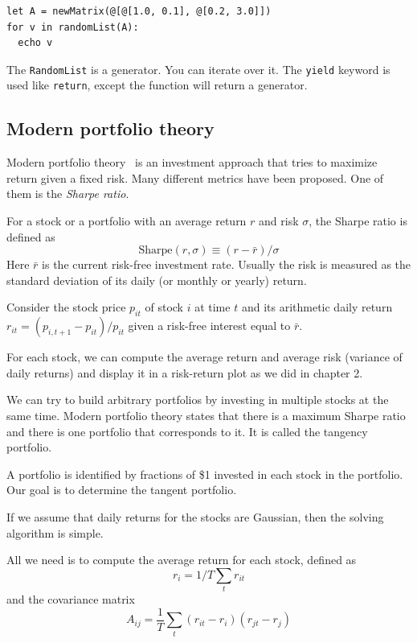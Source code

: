 \documentclass[justified, sixbynine]{tufte-book}
\def\ft{\small\tt}
\theoremstyle{plain}%
\newtheorem * {corollary}{Corollary}
\theoremstyle{definition}
\theoremstyle{remark}
\newtheorem * {remark}{Remark}
\newtheorem * {note}{Note}
\begin{document}
\begin{fullwidth}
\begin{lstlisting}
let A = newMatrix(@[@[1.0, 0.1], @[0.2, 3.0]])
for v in randomList(A):
  echo v
\end{lstlisting}

The {\ft RandomList} is a generator. You can iterate over it. The {\ft yield} keyword is used like {\ft return}, except the function will return a generator.

\goodbreak\subsection{Modern portfolio theory}


Modern portfolio theory~\cite{mpt} is an investment approach that tries to maximize return given a fixed risk. Many different metrics have been proposed. One of them is the {\it Sharpe ratio}.

For a stock or a portfolio with an average return $r$ and risk $\sigma$, the Sharpe ratio is defined as
\begin{equation}
\textrm{Sharpe}(r, \sigma) \equiv (r-\bar r)/\sigma
\end{equation}
Here $\bar r$ is the current risk-free investment rate. Usually the risk is measured as the standard deviation of its daily (or monthly or yearly) return.

Consider the stock price $p_{it}$ of stock $i$ at time $t$ and its arithmetic daily return
$r_{it}=(p_{i, t+1}-p_{it})/p_{it}$ given a risk-free interest equal to $\bar r$.

For each stock, we can compute the average return and average risk (variance of daily returns) and display it in a risk-return plot as we did in chapter 2.

We can try to build arbitrary portfolios by investing in multiple stocks at the same time. Modern portfolio theory states that there is a maximum Sharpe ratio and there is one portfolio that corresponds to it. It is called the tangency portfolio.

A portfolio is identified by fractions of \$1 invested in each stock in the portfolio. Our goal is to determine the tangent portfolio.

If we assume that daily returns for the stocks are Gaussian, then the solving algorithm is simple.

All we need is to compute the average return for each stock, defined as
\begin{equation}
r_i = 1/T \sum_t r_{it}
\end{equation}
and the covariance matrix
\begin{equation}
A_{ij} = \frac1T \sum_t (r_{it}-r_i)(r_{jt}-r_j)
\end{equation}


\end{fullwidth}
\end{document}
